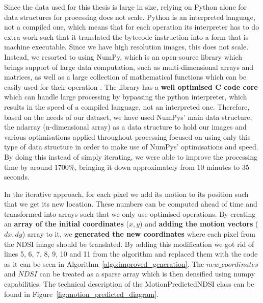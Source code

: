 \documentclass[12pt, a4paper]{report}
\begin{document}
	\par Since the data used for this thesis is large in size, relying on Python alone for data structures for processing does not scale. Python is an interpreted language, not a compiled one, which means that for each operation its interpreter has to do extra work such that it translated the bytecode instruction into a form that is machine executable. Since we have high resolution images, this does not scale. Instead, we resorted to using NumPy, which is an open-source library which brings support of large data computation, such as multi-dimensional arrays and matrices, as well as a large collection of mathematical functions which can be easily used for their operation \cite{HARRIS2020}. The library has a \textbf{well optimised C code core} which can handle large processing by bypassing the python interpreter, which results in the speed of a compiled language, not an interpreted one. Therefore, based on the needs of our dataset, we have used NumPys' main data structure, the ndarray (n-dimensional array) as a data structure to hold our images and various optimisations applied throughout processing focused on using only this type of data structure in order to make use of NumPys' optimisations and speed. By doing this instead of simply iterating, we were able to improve the processing time by around 1700\%, bringing it down approximately from 10 minutes to 35 seconds. 
	
	\par In the iterative approach, for each pixel we add its motion to its position such that we get its new location. These numbers can be computed ahead of time and transformed into arrays such that we only use optimised operations. By creating an \textbf{array of the initial coordinates} (\(x, y\)) and \textbf{adding the motion vectors} (\(dx, dy\)) array to it, we \textbf{generated the new coordinates} where each pixel from the NDSI image should be translated. By adding this modification we got rid of lines 5, 6, 7, 8, 9, 10 and 11 from the algorithm and replaced them with the code as it can be seen in Algorithm~\ref{algo:improved_generation}. The \(new\_coordinates\) and \(NDSI\) can be treated as a sparse array which is then densified using numpy capabilities. The technical description of the MotionPredictedNDSI class can be found in Figure~\ref{fig:motion_predicted_diagram}.
	
\end{document}

